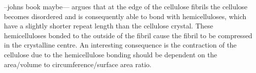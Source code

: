 --johns book maybe--- argues that at the edge of the cellulose fibrils the cellulose becomes
disordered and is consequently able to bond with hemicelluloses, which have a
slightly shorter repeat length than the cellulose crystal. These hemicelluloses
bonded to the outside of the fibril cause the fibril to be compressed in the
crystalline centre. An interesting consequence
is the contraction of the cellulose due to the hemicellulose bonding should be
dependent on the area/volume to circumference/surface area ratio.